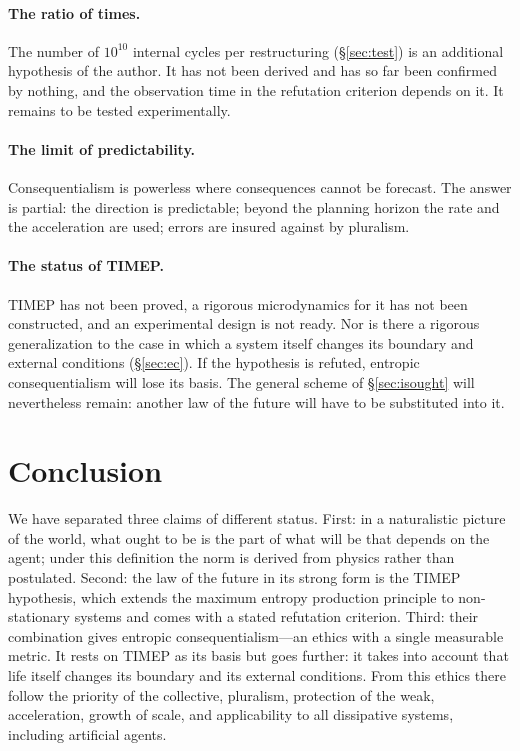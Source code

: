 \documentclass[11pt,a4paper]{article}
\newcommand{\Sref}[1]{\hyperref[#1]{\S\ref{#1}}}
\begin{document}
\paragraph{The ratio of times.}
The number of $10^{10}$ internal cycles per restructuring (\Sref{sec:test}) is an additional hypothesis of the author. It has not been derived and has so far been confirmed by nothing, and the observation time in the refutation criterion depends on it. It remains to be tested experimentally.

\paragraph{The limit of predictability.}
Consequentialism is powerless where consequences cannot be forecast. The answer is partial: the direction is predictable; beyond the planning horizon the rate and the acceleration are used; errors are insured against by pluralism.

\paragraph{The status of TIMEP.}
TIMEP has not been proved, a rigorous microdynamics for it has not been constructed, and an experimental design is not ready. Nor is there a rigorous generalization to the case in which a system itself changes its boundary and external conditions (\Sref{sec:ec}). If the hypothesis is refuted, entropic consequentialism will lose its basis. The general scheme of \Sref{sec:isought} will nevertheless remain: another law of the future will have to be substituted into it.

\section{Conclusion}\label{sec:conclusion}

We have separated three claims of different status. First: in a naturalistic picture of the world, what ought to be is the part of what will be that depends on the agent; under this definition the norm is derived from physics rather than postulated. Second: the law of the future in its strong form is the TIMEP hypothesis, which extends the maximum entropy production principle to non-stationary systems and comes with a stated refutation criterion. Third: their combination gives entropic consequentialism---an ethics with a single measurable metric. It rests on TIMEP as its basis but goes further: it takes into account that life itself changes its boundary and its external conditions. From this ethics there follow the priority of the collective, pluralism, protection of the weak, acceleration, growth of scale, and applicability to all dissipative systems, including artificial agents.
\end{document}

